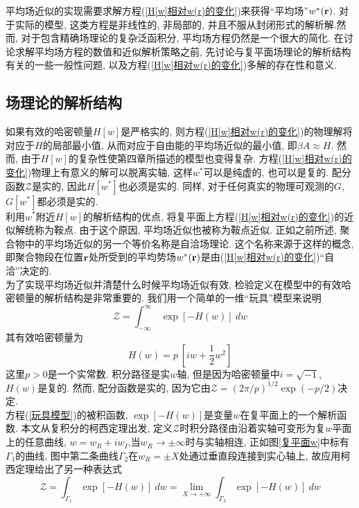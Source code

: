 平均场近似的实现需要求解方程(\ref{H[w]相对w(r)的变化})来获得“平均场”$w^*(\mathbf{r})$. 对于实际的模型, 这类方程是非线性的, 非局部的, 并且不服从封闭形式的解析解.然而, 对于包含精确场理论的复杂泛函积分, 平均场方程仍然是一个很大的简化. 在讨论求解平均场方程的数值和近似解析策略之前, 先讨论与复平面场理论的解析结构有关的一些一般性问题, 以及方程(\ref{H[w]相对w(r)的变化})多解的存在性和意义. \\
\subsection{场理论的解析结构}
如果有效的哈密顿量$H[w]$是严格实的, 则方程(\ref{H[w]相对w(r)的变化})的物理解将对应于$H$的局部最小值, 从而对应于自由能的平均场近似的最小值, 即$\beta A \approx H $. 然而, 由于$H[w]$的复杂性使第四章所描述的模型也变得复杂. 方程(\ref{H[w]相对w(r)的变化})物理上有意义的解可以脱离实轴, 这样$w^*$可以是纯虚的, 也可以是复的. 配分函数$\mathcal{Z}$是实的, 因此$H[w^*]$也必须是实的. 同样, 对于任何真实的物理可观测的$G$, $G[w^*]$都必须是实的. \\

利用$w^*$附近$H[w]$的解析结构的优点, 将复平面上方程(\ref{H[w]相对w(r)的变化})的近似解统称为鞍点. 由于这个原因, 平均场近似也被称为鞍点近似. 正如之前所述, 聚合物中的平均场近似的另一个等价名称是自洽场理论. 这个名称来源于这样的概念, 即聚合物段在位置$\mathbf{r}$处所受到的平均势场$w^*(\mathbf{r})$是由(\ref{H[w]相对w(r)的变化})“自洽”决定的. \\

为了实现平均场近似并清楚什么时候平均场近似有效, 检验定义在模型中的有效哈密顿量的解析结构是非常重要的. 我们用一个简单的一维“玩具”模型来说明\\
\begin{equation}
\mathcal{Z} = \int_{-\infty}^{\infty}\ \exp[-H(w)]\ dw \label{玩具模型}
\end{equation}
其有效哈密顿量为\\
 \begin{equation}
 H(w) = p \ \left[iw+ \frac{1}{2} w^2\right] \label{有效哈密顿量}
 \end{equation}
这里$p>0$是一个实常数. 积分路径是实$w$轴, 但是因为哈密顿量中$i=\sqrt{-1}$, $H(w)$是复的. 然而, 配分函数是实的, 因为它由$\mathcal{Z}=(2\pi/p)^{1/2} \exp(-p/2)$决定. \\

方程(\ref{玩具模型})的被积函数, $\exp[-H(w)]$是变量$w$在复平面上的一个解析函数. 本文从复积分的柯西定理出发, 定义$\mathcal{Z}$时积分路径由沿着实轴可变形为复$w$平面上的任意曲线, $w = w_R +iw_I$,当$w_R \rightarrow  \pm \infty$时与实轴相连, 正如图\ref{复平面w}中标有$\Gamma_1$的曲线, 图中第二条曲线$\Gamma_2$在$w_R=\pm X$处通过垂直段连接到实心轴上, 故应用柯西定理给出了另一种表达式\\
\begin{equation}
\mathcal{Z} = \int_{\Gamma_1} \exp [-H(w)] \ dw = \lim_{X \rightarrow +\infty} \int_{\Gamma_2} \exp[-H(w)] \ dw   \label{Z的另一种表达式}
\end{equation}

